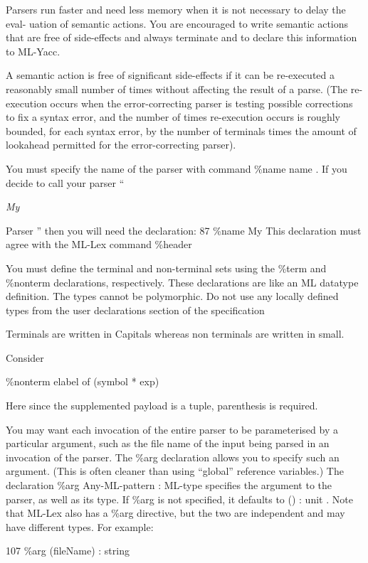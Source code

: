 \documentclass[8pt, a4paper, oneside, twocolumn]{extarticle}
\newcommand{\ita}[1]{
    \textit{#1}
}
\begin{document}
Parsers run faster and need less memory when it is not necessary to delay the eval-
uation of semantic actions.  You are encouraged to write semantic actions that are free
of side-effects and always terminate and to declare this information to ML-Yacc.

A semantic action is free of significant side-effects if it can be re-executed a reasonably
small number of times without affecting the result of a parse.  (The re-execution occurs
when the error-correcting parser is testing possible corrections to fix a syntax error, and
the number of times re-execution occurs is roughly bounded, for each syntax error, by the
number of terminals times the amount of lookahead permitted for the error-correcting
parser).

You must specify the name of the parser with command
\%name
name
.  If you decide to
call your parser “
\ita{My}
Parser
” then you will need the declaration:
87
\%name My
This declaration must agree with the ML-Lex command
\%header


You  must  define  the  terminal  and  non-terminal  sets  using  the
\%term
and
\%nonterm
declarations, respectively.  These declarations are like an ML datatype definition.
The types cannot be polymorphic. Do not use any locally defined types from the user
declarations section of the specification

Terminals are written in Capitals whereas non terminals are written in small.

Consider 

\%nonterm elabel of (symbol * exp)

Here since the supplemented payload is a tuple, parenthesis is required.

You may want each invocation of the entire parser to be parameterised by a particular
argument, such as the file name of the input being parsed in an invocation of the parser.
The
\%arg
declaration  allows  you  to  specify  such  an  argument.   (This  is  often  cleaner
than using “global” reference variables.)  The declaration
\%arg
Any-ML-pattern
:
ML-type
specifies  the  argument  to  the  parser,  as  well  as  its  type.   If
\%arg
is  not  specified,  it
defaults to
() :  unit
.
Note that ML-Lex also has a
\%arg
directive, but the two are independent and may
have different types.
For example:

107
\%arg (fileName) : string
\end{document}
